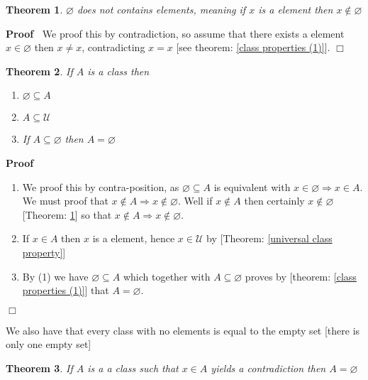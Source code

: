 \documentclass{book}
\newcommand{\nin}{\not\in}
\newenvironment{proof}{\noindent\textbf{Proof\ }}{\hspace*{\fill}$\Box$\medskip}
\newtheorem{theorem}{Theorem}
\begin{document}
\begin{theorem}
  \label{empty set property}$\varnothing$ does not contains elements, meaning
  if $x$ is a element then $x \nin \varnothing$
\end{theorem}

\begin{proof}
  We proof this by contradiction, so assume that there exists a element $x \in
  \varnothing$ then $x \neq x$, contradicting $x = x$ [see theorem: \ref{class
  properties (1)}].
\end{proof}

\begin{theorem}
  \label{class empty set}If $A$ is a class then
  \begin{enumerate}
    \item $\varnothing \subseteq A$
    
    \item $A \subseteq \mathcal{U}$
    
    \item If $A \subseteq \varnothing$ then $A = \varnothing$
  \end{enumerate}
\end{theorem}

\begin{proof}
  
  \begin{enumerate}
    \item We proof this by contra-position, as $\varnothing \subseteq A$ is
    equivalent with $x \in \varnothing \Rightarrow x \in A$. We must proof
    that $x \nin A \Rightarrow x \nin \varnothing$. Well if $x \nin A$ then
    certainly $x \nin \varnothing$ [Theorem: \ref{empty set property}] so that
    $x \nin A \Rightarrow x \nin \varnothing$.
    
    \item If $x \in A$ then $x$ is a element, hence $x \in \mathcal{U}$ by
    [Theorem: \ref{universal class property}]
    
    \item By (1) we have $\varnothing \subseteq A$ which together with $A
    \subseteq \varnothing$ proves by [theorem: \ref{class properties (1)}]
    that $A = \varnothing$.
  \end{enumerate}
\end{proof}

We also have that every class with no elements is equal to the empty set
[there is only one empty set]

\begin{theorem}
  \label{class empty set is unique}If $A$ is a a class such that $x \in A$
  yields a contradiction then $A = \varnothing$
\end{theorem}
\end{document}
